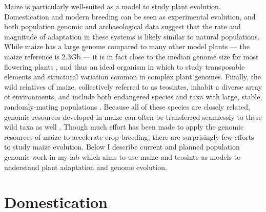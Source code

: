 \documentclass[11pt,letterpaper]{article}
\begin{document}
Maize is particularly well-suited as a model to study plant evolution.
Domestication and modern breeding can be seen as experimental evolution, and both population genomic \citep{hufford2012comparative} and archaeological data \citep{purugganan2011archaeological} suggest that the rate and magnitude of adaptation in these systems is likely similar to natural populations.
While maize has a large genome compared to many other model plants --- the maize reference is 2.3Gb \citep{schnable2009the-b73-maize} ---  it is in fact  close to the median genome size for most flowering plants \citep{leitch2013genome}, and thus an ideal organism in which to study transposable elements and structural variation common in complex plant genomes.  
Finally, the wild relatives of maize, collectively referred to as teosintes, inhabit a diverse array of environments, and include both endangered species and taxa with large, stable, randomly-mating populations \citep{hufford2012teosinte}.
Because all of these species are closely related, genomic resources developed in maize can often be transferred seamlessly to these wild taxa as well \citep[e.g.][]{pyhajarvi2013complex,fang2012megabase}.
Though much effort has been made to apply the genomic resources of maize to accelerate crop breeding, there are surprisingly few efforts to study maize evolution. 
Below I describe current and planned population genomic work in my lab which aims to use maize and teosinte as models to understand plant adaptation and genome evolution.  

\section*{Domestication} %
\end{document}
